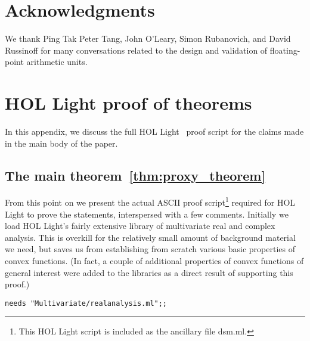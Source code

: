 \documentclass[10pt]{article}
\theoremstyle{definition}
\theoremstyle{remark}
\numberwithin{equation}{section}
\begin{document}

\section*{Acknowledgments\label{sec:acknowledgments}}

We thank Ping Tak Peter Tang, John O'Leary, Simon Rubanovich, and David Russinoff for many conversations related to the design and validation of floating-point arithmetic units.


\appendix

\section{HOL Light proof of theorems}\label{section:appendix}

In this appendix, we discuss the full HOL Light~\cite{harrison1996hol} proof script
for the claims made in the main body of the paper.

\subsection{The main theorem~\ref{thm:proxy_theorem}}

From this point on we present the actual ASCII proof script\footnote{This HOL Light script is included as the ancillary file dsm.ml.} required for HOL
Light to prove the statements, interspersed with a few comments. Initially we
load HOL Light's fairly extensive library of multivariate real and complex
analysis. This is overkill for the relatively small amount of background
material we need, but saves us from establishing from scratch various basic
properties of convex functions. (In fact, a couple of additional properties of
convex functions of general interest were added to the libraries as a direct
result of supporting this proof.)

\begin{scriptsize}\begin{verbatim}
needs "Multivariate/realanalysis.ml";;
\end{verbatim}\end{scriptsize}
\end{document}
